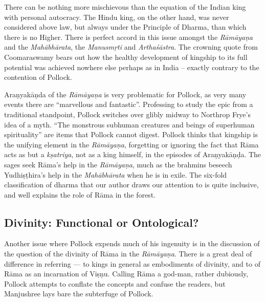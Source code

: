 There can be nothing more mischievous than the equation of the Indian king with personal autocracy. The Hindu king, on the other hand, was never considered above law, but always under the Principle of Dharma, than which there is no Higher. There is perfect accord in this issue amongst the {\sl Rāmāyaṇa} and the {\sl Mahābhārata}, the {\sl Manusmṛti} and {\sl Arthaśāstra}. The crowning quote from Coomaraswamy bears out how the healthy development of kingship to its full potential was achieved nowhere else perhaps as in India -- exactly contrary to the contention of Pollock.

Araṇyakāṇda of the {\sl Rāmāyaṇa} is very problematic for Pollock, as very many events there are “marvellous and fantastic”. Professing to study the epic from a traditional standpoint, Pollock switches over glibly midway to Northrop Frye's idea of a myth. ``The monstrous subhuman creatures and beings of superhuman spirituality'' are items that Pollock cannot digest. Pollock thinks that kingship is the unifying element in the {\sl Rāmāyaṇa}, forgetting or ignoring the fact that Rāma acts as but a {\sl kṣatriya}, not as a king himself, in the episodes of Araṇyakāṇḍa. The sages seek Rāma's help in the {\sl Rāmāyaṇa}, much as the brahmins beseech Yudhiṣṭhira's help in the {\sl Mahābhārata} when he is in exile. The six-fold classification of dharma that our author draws our attention to is quite inclusive, and well explains the role of Rāma in the forest.\\[-20pt]

\subsection*{Divinity: Functional or Ontological?}

Another issue where Pollock expends much of his ingenuity is in the discussion of the question of the divinity of Rāma in the {\sl Rāmāyaṇa}. There is a great deal of difference in referring --- to kings in general as embodiments of divinity, and to of Rāma as an incarnation of Viṣṇu. Calling Rāma a god-man, rather dubiously, Pollock attempts to conflate the concepts and confuse the readers, but Manjushree lays bare the subterfuge of Pollock.

